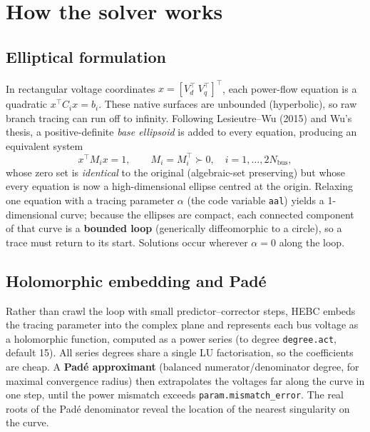 \documentclass[11pt,a4paper]{article}
\newcommand{\code}[1]{\texttt{#1}}
\begin{document}
\section{How the solver works}

\subsection{Elliptical formulation}
In rectangular voltage coordinates $x=[V_d^\top\ V_q^\top]^\top$, each power-flow
equation is a quadratic $x^\top C_i x = b_i$. These native surfaces are unbounded
(hyperbolic), so raw branch tracing can run off to infinity. Following
Lesieutre--Wu (2015) and Wu's thesis, a positive-definite \emph{base
ellipsoid} is added to every equation, producing an equivalent system
\[
  x^\top M_i x = 1, \qquad M_i = M_i^\top \succ 0, \quad i=1,\dots,2N_{\text{bus}},
\]
whose zero set is \emph{identical} to the original (algebraic-set preserving) but whose
every equation is now a high-dimensional ellipse centred at the origin. Relaxing one
equation with a tracing parameter $\alpha$ (the code variable \code{aal}) yields a
1-dimensional curve; because the ellipses are compact, each connected component of that
curve is a \textbf{bounded loop} (generically diffeomorphic to a circle), so a trace must
return to its start. Solutions occur wherever $\alpha=0$ along the loop.

\subsection{Holomorphic embedding and Pad\'e}
Rather than crawl the loop with small predictor--corrector steps, HEBC embeds the tracing
parameter into the complex plane and represents each bus voltage as a holomorphic
function, computed as a power series (to degree \code{degree.act}, default 15). All
series degrees share a single LU factorisation, so the coefficients are cheap. A
\textbf{Pad\'e approximant} (balanced numerator/denominator degree, for maximal
convergence radius) then extrapolates the voltages far along the curve in one step, until
the power mismatch exceeds \code{param.mismatch_error}. The real roots of the Pad\'e
denominator reveal the location of the nearest singularity on the curve.
\end{document}
